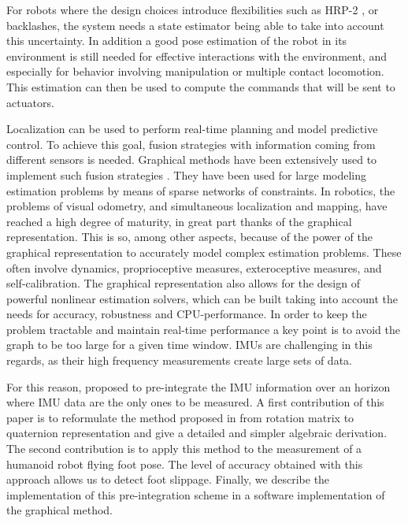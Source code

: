 For robots where the design choices introduce flexibilities such as HRP-2 \cite{Nakaoka:iros:2007}, or backlashes, the system needs a state estimator being able to take into account this uncertainty.
In addition a good pose estimation of the robot in its environment is still needed for effective interactions with the environment,
and especially for behavior involving manipulation or multiple contact locomotion.
This estimation can then be used to compute the commands that will be sent to actuators.


Localization can be used to perform real-time planning and model predictive control.
To achieve this goal, fusion strategies with information coming from different sensors is needed.
Graphical methods have been extensively used to implement such fusion strategies \cite{Thrun:ijrr:2006,Kaess:itro:2008}.
They have been used for large modeling estimation problems by means of sparse networks of constraints. 
In robotics, the problems of visual odometry, and simultaneous localization and mapping, have reached a high degree of maturity, 
in great part thanks of the graphical representation. 
This is so, among other aspects, because of the power of the graphical representation to accurately model complex estimation problems. 
These often involve dynamics, proprioceptive measures, exteroceptive measures, and self-calibration.
The graphical representation also allows for the design of powerful nonlinear estimation solvers, which can be built taking into account the needs for accuracy, 
robustness and CPU-performance.
In order to keep the problem tractable and maintain real-time performance a key point is to avoid the graph to be too large for a given time window.
IMUs are challenging in this regards, as their high frequency measurements create large sets of data. 
 
For this reason, \cite{LUPTON-09,forster2015imu} proposed to pre-integrate the IMU information over an horizon where IMU data are the only
ones to be measured.
A first contribution of this paper is to reformulate the method proposed in \cite{forster2015imu} from rotation matrix to quaternion representation
and give a detailed and simpler algebraic derivation.
The second contribution is to apply this method to the measurement of a humanoid robot flying foot pose.
The level of accuracy obtained with this approach allows us to detect foot slippage. 
Finally, we describe the implementation of this pre-integration scheme in a software implementation of the graphical method.





